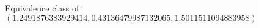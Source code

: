 \documentclass[preview]{standalone}
\begin{document}
\begin{center}
Equivalence class of $(1.2491876383929414, 0.43136479987132065, 1.5011511094883958)$
\end{center}
\end{document}
